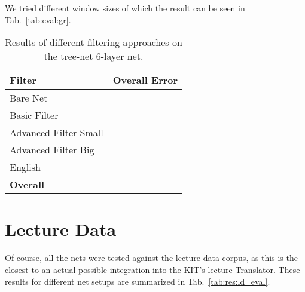 We tried different window sizes of which the result can be seen in Tab.~\ref{tab:eval:gr}. 


\begin{table}[h!]
\label{tab:evalTotal}
\centering
\begin{tabular}{| l | r |}
	\hline
	\textbf{Filter} & \textbf{Overall Error}  \\
	\hline
	 Bare Net & \\
	\hline
	Basic Filter &  \\
	\hline
	Advanced Filter Small & \\
	\hline
	Advanced Filter Big &  \\
	\hline
	English &  \\
	\hline
	\textbf{Overall} &  \\
	\hline
\end{tabular}
\caption{Results of different filtering approaches on the tree-net 6-layer net.}
\end{table}
\section{Lecture Data}
\label{sec:eval:ld}
Of course, all the nets were tested against the lecture data corpus, as this is the closest to an actual possible integration into the KIT's lecture Translator. These results for different net setups are summarized in Tab.~\ref{tab:res:ld_eval}. 

	